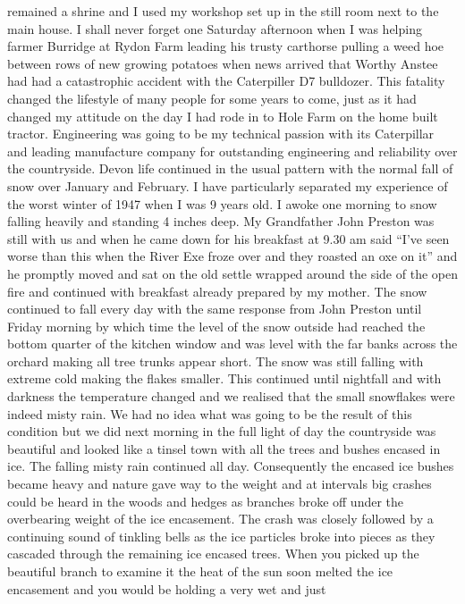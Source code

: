remained a shrine and I used my workshop set up in the still room next to the
main house.  I shall never forget one Saturday afternoon when I was helping
farmer Burridge at Rydon Farm leading his trusty carthorse pulling a weed hoe
between rows of new growing potatoes when news arrived that Worthy Anstee had
had a catastrophic accident with the Caterpiller D7 bulldozer.  This fatality
changed the lifestyle of many people for some years to come, just as it had
changed my attitude on the day I had rode in to Hole Farm on the home built
tractor.  Engineering was going to be my technical passion with its Caterpillar
and leading manufacture company for outstanding engineering and reliability
over the countryside. Devon life continued in the usual pattern with the normal
fall of snow over January and February.  I have particularly separated my
experience of the worst winter of 1947 when I was 9 years old.  I awoke one
morning to snow falling heavily and standing 4 inches deep.  My Grandfather
John Preston was still with us and when he came down for his breakfast at 9.30
am said ``I've seen worse than this when the River Exe froze over and they
roasted an oxe on it'' and he promptly moved and sat on the old settle wrapped
around the side of the open fire and continued with breakfast already prepared
by my mother. The snow continued to fall every day with the same response from
John Preston until Friday morning by which time the level of the snow outside
had reached the bottom quarter of the kitchen window and was level with the far
banks across the orchard making all tree trunks appear short.  The snow was
still falling with extreme cold making the flakes smaller.  This continued
until nightfall and with darkness the temperature changed and we realised that
the small snowflakes were indeed misty rain.  We had no idea what was going to
be the result of this condition but we did next morning in the full light of
day the countryside  was beautiful and looked like a tinsel town with all the
trees and bushes encased in ice.  The falling misty rain continued all day.
Consequently the encased ice bushes became heavy and nature gave way to the
weight and at intervals big crashes could be heard in the woods and hedges as
branches broke off under the overbearing weight of the ice encasement.  The
crash was closely followed by a continuing sound of tinkling bells as the ice
particles broke into pieces as they cascaded through the remaining ice encased
trees.  When you picked up the beautiful branch to examine it the heat of the
sun soon melted the ice encasement and you would be holding a very wet and just
